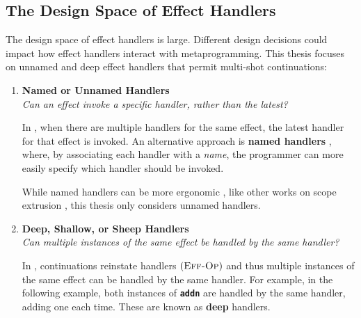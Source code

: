 \subsection{The Design Space of Effect Handlers}\label{subsection:effect-handler-design}
The design space of effect handlers is large. Different design decisions could impact how effect handlers interact with metaprogramming. This thesis focuses on unnamed and deep effect handlers that permit multi-shot continuations:

\renewcommand{\effconfiguration}[2]{{#1}; {#2}}
\renewcommand{\transition}[2]{#1 & \rightarrow & #2}
\newcommand{\rulename}[2]{(\textsc{{#1}-{#2}})}
\newcommand{\reductionRule}[1]{\rulename{Red}{#1}}
\newcommand{\congruenceRule}[1]{\rulename{Cng}{#1}}
\newcommand{\effectRule}[1]{\rulename{Eff}{#1}}

\begin{enumerate} 

 \item \textbf{\textsf{Named or Unnamed Handlers}}\\
        \textit{Can an effect invoke a specific handler, rather than the latest?}
        
        In \efflang{}, when there are multiple handlers for the same effect, the latest handler for that effect is invoked. An alternative approach is \textbf{named handlers} \citep{xie-2022}, where, by associating each handler with a \textit{name}, the programmer can more easily specify which handler should be invoked. 

        While named handlers can be more ergonomic \citep{xie-2022}, like other works on scope extrusion \citep{isoda-24}, this thesis only considers unnamed handlers.

  \item \textbf{\textsf{Deep, Shallow, or Sheep Handlers}}\\
         \textit{Can multiple instances of the same effect be handled by the same handler?}

         In \efflang{}, continuations reinstate handlers $\effectRule{Op}$ and thus multiple instances of the same effect can be handled by the same handler. For example, in the following example, both instances of \textbf{\texttt{addn}} are handled by the same handler, adding one each time. These are known as \textbf{deep} handlers.
          

\end{enumerate}

